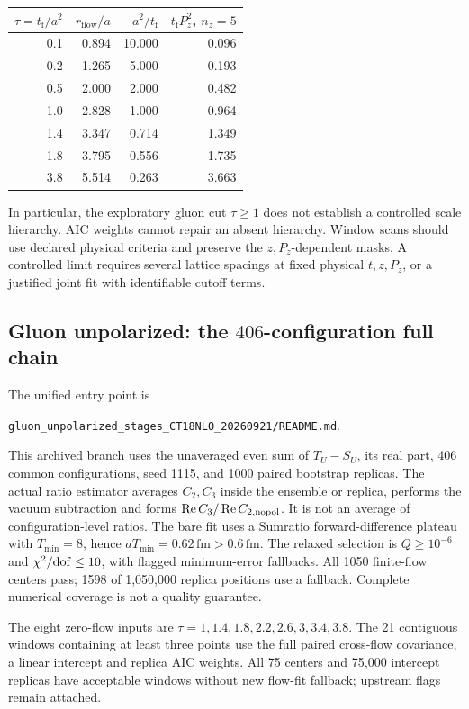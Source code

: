 \documentclass[11pt]{article}
\numberwithin{equation}{section}
\newcommand{\rflow}{r_{\mathrm{flow}}}
\newcommand{\tf}{t_{\mathrm f}}
\begin{document}
\begin{center}
\begin{tabular}{rrrr}
\toprule
\(\tau=\tf/a^2\) & \(\rflow/a\) & \(a^2/\tf\) &
\(\tf P_z^2\), \(n_z=5\)\\
\midrule
0.1 & 0.894 & 10.000 & 0.096\\
0.2 & 1.265 & 5.000 & 0.193\\
0.5 & 2.000 & 2.000 & 0.482\\
1.0 & 2.828 & 1.000 & 0.964\\
1.4 & 3.347 & 0.714 & 1.349\\
1.8 & 3.795 & 0.556 & 1.735\\
3.8 & 5.514 & 0.263 & 3.663\\
\bottomrule
\end{tabular}
\end{center}
In particular, the exploratory gluon cut \(\tau\ge1\) does not establish
a controlled scale hierarchy. AIC weights cannot repair an absent
hierarchy. Window scans should use declared physical criteria and preserve
the \(z,P_z\)-dependent masks. A controlled limit requires several lattice
spacings at fixed physical \(t,z,P_z\), or a justified joint fit with
identifiable cutoff terms.

\subsection{Gluon unpolarized: the \(406\)-configuration full chain}

The unified entry point is
\begin{center}
\nolinkurl{gluon_unpolarized_stages_CT18NLO_20260921/README.md}.
\end{center}
This archived branch uses the unaveraged even sum of \(T_U-S_U\), its real
part, 406 common configurations, seed 1115, and 1000 paired bootstrap replicas. The actual
ratio estimator averages \(C_2,C_3\) inside the ensemble or replica,
performs the vacuum subtraction and forms
\(\operatorname{Re}C_3/\operatorname{Re}C_{2,\rm nopol}\).
It is not an average of configuration-level ratios.
The bare fit uses a Sumratio forward-difference plateau with
\(T_{\min}=8\), hence \(aT_{\min}=0.62\,\mathrm{fm}>0.6\,\mathrm{fm}\).
The relaxed selection is \(Q\ge10^{-6}\) and
\(\chi^2/{\rm dof}\le10\), with flagged minimum-error fallbacks.
All 1050 finite-flow centers pass; 1598 of 1,050,000 replica positions
use a fallback. Complete numerical coverage is not a quality guarantee.

The eight zero-flow inputs are
\(\tau=1,1.4,1.8,2.2,2.6,3,3.4,3.8\).
The 21 contiguous windows containing at least three points use the full
paired cross-flow covariance, a linear intercept and replica AIC weights.
All 75 centers and 75,000 intercept replicas have acceptable windows
without new flow-fit fallback; upstream flags remain attached.
\end{document}
